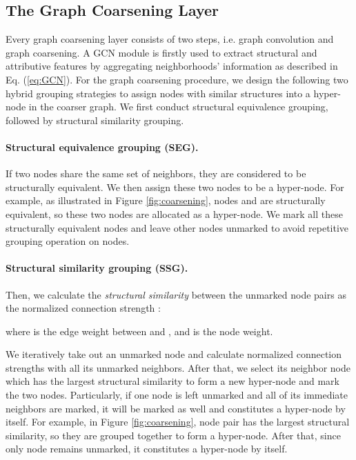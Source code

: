 \documentclass{article}
\begin{document}
\subsection{The Graph Coarsening Layer}

Every graph coarsening layer consists of two steps, i.e. graph convolution and graph coarsening. A GCN module is firstly used to extract structural and attributive features by aggregating neighborhoods' information as described in Eq. (\ref{eq:GCN}). For the graph coarsening procedure, we design the following two hybrid grouping strategies to assign nodes with similar structures into a hyper-node in the coarser graph. We first conduct structural equivalence grouping, followed by structural similarity grouping.

\paragraph{Structural equivalence grouping (SEG).}
If two nodes share the same set of neighbors, they are considered to be structurally equivalent. We then assign these two nodes to be a hyper-node. For example, as illustrated in Figure \ref{fig:coarsening}, nodes  and  are structurally equivalent, so these two nodes are allocated as a hyper-node. We mark all these structurally equivalent nodes and leave other nodes unmarked to avoid repetitive grouping operation on nodes.

\paragraph{Structural similarity grouping (SSG).}
Then, we calculate the {\it structural similarity} between the unmarked node pairs  as the normalized connection strength :

where  is the edge weight between  and , and  is the node weight.

We iteratively take out an unmarked node  and calculate normalized connection strengths with all its unmarked neighbors. After that, we select its neighbor node  which has the largest structural similarity to form a new hyper-node and mark the two nodes. Particularly, if one node is left unmarked and all of its immediate neighbors are marked, it will be marked as well and constitutes a hyper-node by itself. For example, in Figure \ref{fig:coarsening}, node pair  has the largest structural similarity, so they are grouped together to form a hyper-node. After that, since only node  remains unmarked, it constitutes a hyper-node by itself.
\end{document}
